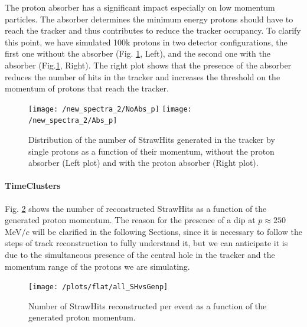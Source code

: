 \documentclass[12pt,a4paper,openright, oneside, titlepage]{book} %
\begin{document}
\noindent 
The proton absorber has a significant impact especially on low momentum particles. 
The absorber determines the minimum energy protons should have to reach the tracker
and thus contributes to reduce the tracker occupancy.
To clarify this point, we have simulated 100k protons in two detector configurations, the first one without the absorber  (Fig. \ref{_proton_absorber}, Left), and the second one with the absorber (Fig.\ref{_proton_absorber}, Right). 
The right plot shows that the presence of the absorber reduces the number of hits in the tracker and increases the threshold on the momentum of protons that reach the tracker.


\begin{figure}[h!]
\centering
\texttt{[image: /new\_spectra\_2/NoAbs\_p]}\hfill
\texttt{[image: /new\_spectra\_2/Abs\_p]}
\caption[StrawHits with and without proton absorber]
{Distribution of the number of StrawHits generated in the tracker by single protons as a function of their momentum, without the proton absorber (Left plot) and with the proton absorber (Right plot).}
\label{_proton_absorber}
\end{figure}

\paragraph{TimeClusters} 
Fig. \ref{_all_SHvsGenp} shows the number of reconstructed StrawHits as a function of the generated proton momentum.
The reason for the presence of a dip at $p\approx 250$ MeV$/c$ will be clarified in the following Sections, since it is necessary to follow the steps of track reconstruction to fully understand it, but we can anticipate it is due to the simultaneous presence of the central hole in the tracker and the momentum range of the protons we are simulating.

\begin{figure}[h!]
\centering
\texttt{[image: /plots/flat/all\_SHvsGenp]}
\caption[Number of StrawHits per event]{Number of StrawHits reconstructed per event as a function of the generated proton momentum.}
\label{_all_SHvsGenp}
\end{figure}
\end{document}
